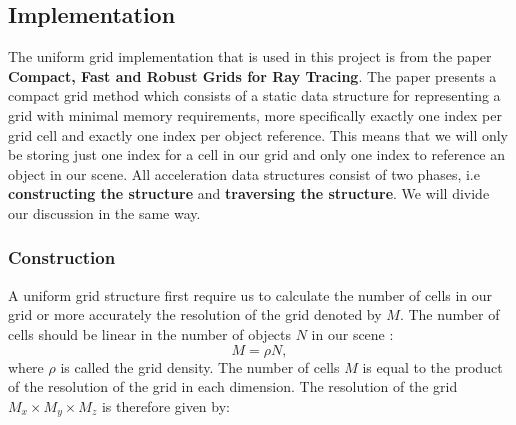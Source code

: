 \documentclass[11pt,a4paper]{article}
\begin{document}
\subsection{Implementation}
The uniform grid implementation that is used in this project is from the paper \textbf{Compact, Fast and Robust Grids for Ray Tracing}\cite{lagae2008compact}. The paper presents a compact grid method which consists of a static data structure for representing a grid with minimal memory requirements, more specifically exactly one index per grid cell and exactly one index per object reference. This means that we will only be storing just one index for a cell in our grid and only one index to reference an object in our scene. All acceleration data structures consist of two phases, i.e \textbf{constructing the structure} and \textbf{traversing the structure}. We will divide our discussion in the same way.
\subsubsection{Construction}
A uniform grid structure first require us to calculate the number of cells in our grid or more accurately the resolution of the grid denoted by $M$. The number of cells should be linear in the number of objects $N$ in our scene \cite{devillers1988methodes}:
\begin{equation}
M = \rho N,
\end{equation}
where $\rho$ is called the grid density. The number of cells $M$ is equal to the product of the resolution of the grid in each dimension. The resolution of the grid $M_{x} \times M_{y} \times M_{z}$ is therefore given by:
\end{document}
